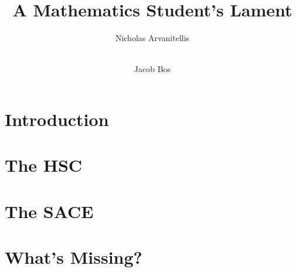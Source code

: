 \documentclass[11pt]{report}
\title{A Mathematics Student's Lament}
\author[1]{Nicholas Arvanitellis}
\author[2]{\\Jacob Bos}
\affil[1,2]{Australian National University}
\begin{document}
    \maketitle
    \tableofcontents
\newpage
{}

\chapter{Introduction}




\chapter{The HSC}




\chapter{The SACE}




\chapter{What's Missing?}




\end{document}

